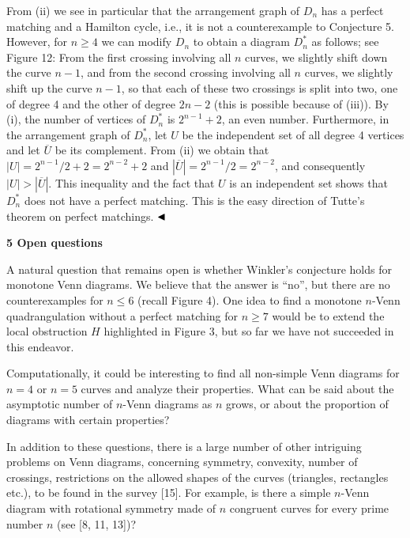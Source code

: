 \documentclass[10pt,a4paper]{article}
\begin{document}
From (ii) we see in particular that the arrangement graph of $D_{n}$ has a perfect matching and a Hamilton cycle, i.e., it is not a counterexample to Conjecture 5. However, for $n\geq 4$ we can modify $D_{n}$ to obtain a diagram $D_{n}^{*}$ as follows; see Figure 12: From the first crossing involving all $n$ curves, we slightly shift down the curve $n-1$, and from the second crossing involving all $n$ curves, we slightly shift up the curve $n-1$, so that each of these two crossings is split into two, one of degree 4 and the other of degree $2n-2$ (this is possible because of (iii)). By (i), the number of vertices of $D_{n}^{*}$ is $2^{n-1}+2$, an even number. Furthermore, in the arrangement graph of $D_{n}^{*}$, let $U$ be the independent set of all degree 4 vertices and let $\overline{U}$ be its complement. From (ii) we obtain that $|U|=2^{n-1}/2+2=2^{n-2}+2$ and $|\overline{U}|=2^{n-1}/2=2^{n-2}$, and consequently $|U|>|\overline{U}|$. This inequality and the fact that $U$ is an independent set shows that $D_{n}^{*}$ does not have a perfect matching. This is the easy direction of Tutte’s theorem on perfect matchings. $\hfill\blacktriangleleft$
\par
\par
\par\medskip\noindent\textbf{5 Open questions}\par
A natural question that remains open is whether Winkler’s conjecture holds for monotone Venn diagrams. We believe that the answer is “no”, but there are no counterexamples for $n\leq 6$ (recall Figure 4). One idea to find a monotone $n$-Venn quadrangulation without a perfect matching for $n\geq 7$ would be to extend the local obstruction $H$ highlighted in Figure 3, but so far we have not succeeded in this endeavor.
\par
\par
Computationally, it could be interesting to find all non-simple Venn diagrams for $n=4$ or $n=5$ curves and analyze their properties. What can be said about the asymptotic number of $n$-Venn diagrams as $n$ grows, or about the proportion of diagrams with certain properties?
\par
\par
In addition to these questions, there is a large number of other intriguing problems on Venn diagrams, concerning symmetry, convexity, number of crossings, restrictions on the allowed shapes of the curves (triangles, rectangles etc.), to be found in the survey [15]. For example, is there a simple $n$-Venn diagram with rotational symmetry made of $n$ congruent curves for every prime number $n$ (see [8, 11, 13])?
\end{document}
